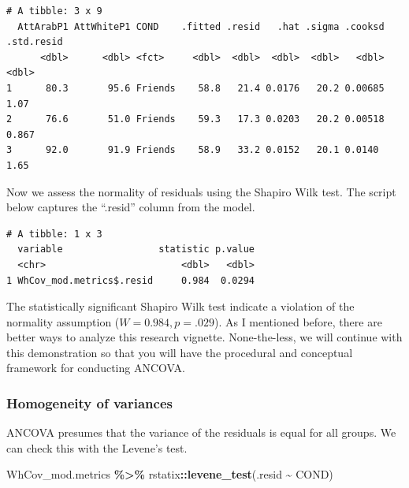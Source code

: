 \documentclass[
  11pt,
]{book}
\newenvironment{Shaded}{\begin{snugshade}}{\end{snugshade}}
\newcommand{\FunctionTok}[1]{\textcolor[rgb]{0.27,0.27,0.27}{\textbf{#1}}}
\newcommand{\NormalTok}[1]{#1}
\newcommand{\SpecialCharTok}[1]{\textcolor[rgb]{0.43,0.43,0.43}{\textbf{#1}}}
\begin{document}
\begin{verbatim}
# A tibble: 3 x 9
  AttArabP1 AttWhiteP1 COND    .fitted .resid   .hat .sigma .cooksd .std.resid
      <dbl>      <dbl> <fct>     <dbl>  <dbl>  <dbl>  <dbl>   <dbl>      <dbl>
1      80.3       95.6 Friends    58.8   21.4 0.0176   20.2 0.00685      1.07 
2      76.6       51.0 Friends    59.3   17.3 0.0203   20.2 0.00518      0.867
3      92.0       91.9 Friends    58.9   33.2 0.0152   20.1 0.0140       1.65 
\end{verbatim}

Now we assess the normality of residuals using the Shapiro Wilk test. The script below captures the ``.resid'' column from the model.

\begin{Shaded}
\end{Shaded}

\begin{verbatim}
# A tibble: 1 x 3
  variable                 statistic p.value
  <chr>                        <dbl>   <dbl>
1 WhCov_mod.metrics$.resid     0.984  0.0294
\end{verbatim}

The statistically significant Shapiro Wilk test indicate a violation of the normality assumption (\(W = 0.984, p = .029\)). As I mentioned before, there are better ways to analyze this research vignette. None-the-less, we will continue with this demonstration so that you will have the procedural and conceptual framework for conducting ANCOVA.

\hypertarget{homogeneity-of-variances-1}{%
\subsubsection{Homogeneity of variances}\label{homogeneity-of-variances-1}}

ANCOVA presumes that the variance of the residuals is equal for all groups. We can check this with the Levene's test.

\begin{Shaded}
\begin{Highlighting}[]
\NormalTok{WhCov\_mod.metrics }\SpecialCharTok{\%\textgreater{}\%}
\NormalTok{    rstatix}\SpecialCharTok{::}\FunctionTok{levene\_test}\NormalTok{(.resid }\SpecialCharTok{\textasciitilde{}}\NormalTok{ COND)}
\end{Highlighting}
\end{Shaded}
\end{document}
